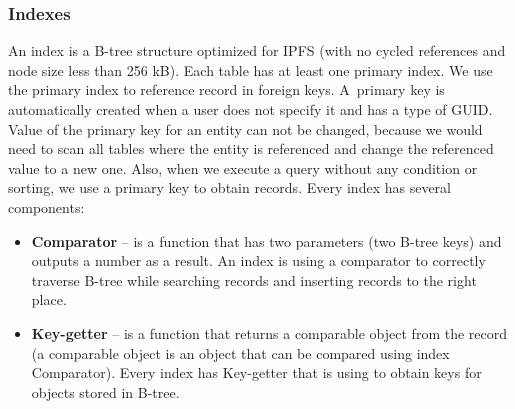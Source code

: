 \subsubsection{Indexes}
An index is a B-tree structure optimized for IPFS (with no cycled references and node size less than 256 kB). Each table has at least one primary index. We use the primary index to reference record in foreign keys. A~primary key is automatically created when a user does not specify it and has a type of GUID. Value of the primary key for an entity can not be changed, because we would need to scan all tables where the entity is referenced and change the referenced value to a new one. Also, when we execute a query without any condition or sorting, we use a primary key to obtain records. Every index has several components: 
\begin{itemize}
    \item \textbf{Comparator} -- is a function that has two parameters (two B-tree keys) and outputs a number as a result. An index is using a comparator to correctly traverse B-tree while searching records and inserting records to the right place.
    \item \textbf{Key-getter} -- is a function that returns a comparable object from the record (a comparable object is an object that can be compared using index Comparator). Every index has Key-getter that is using to obtain keys for objects stored in B-tree.
\end{itemize}

